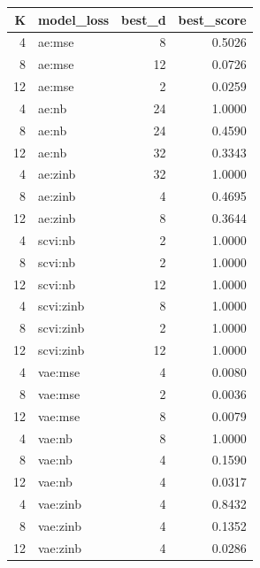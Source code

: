 \begin{tabular}{rlrr}
\toprule
K & model\_loss & best\_d & best\_score \\
\midrule
4 & ae:mse & 8 & 0.5026 \\
8 & ae:mse & 12 & 0.0726 \\
12 & ae:mse & 2 & 0.0259 \\
4 & ae:nb & 24 & 1.0000 \\
8 & ae:nb & 24 & 0.4590 \\
12 & ae:nb & 32 & 0.3343 \\
4 & ae:zinb & 32 & 1.0000 \\
8 & ae:zinb & 4 & 0.4695 \\
12 & ae:zinb & 8 & 0.3644 \\
4 & scvi:nb & 2 & 1.0000 \\
8 & scvi:nb & 2 & 1.0000 \\
12 & scvi:nb & 12 & 1.0000 \\
4 & scvi:zinb & 8 & 1.0000 \\
8 & scvi:zinb & 2 & 1.0000 \\
12 & scvi:zinb & 12 & 1.0000 \\
4 & vae:mse & 4 & 0.0080 \\
8 & vae:mse & 2 & 0.0036 \\
12 & vae:mse & 8 & 0.0079 \\
4 & vae:nb & 8 & 1.0000 \\
8 & vae:nb & 4 & 0.1590 \\
12 & vae:nb & 4 & 0.0317 \\
4 & vae:zinb & 4 & 0.8432 \\
8 & vae:zinb & 4 & 0.1352 \\
12 & vae:zinb & 4 & 0.0286 \\
\bottomrule
\end{tabular}
